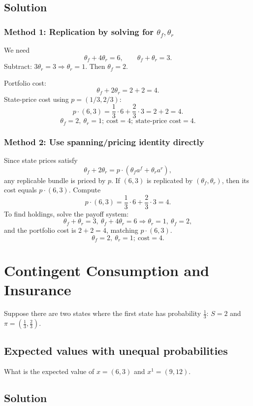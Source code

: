 \documentclass[12pt]{article}
\newcommand{\dotp}{\cdot}
\begin{document}
\subsection*{Solution}
\subsubsection*{Method 1: Replication by solving for \(\theta_f,\theta_r\)}
We need
\[
\theta_f+4\theta_r=6,\qquad \theta_f+\theta_r=3.
\]
Subtract: \(3\theta_r=3\Rightarrow \theta_r=1\). Then \(\theta_f=2\).

Portfolio cost:
\[
\theta_f+2\theta_r=2+2=4.
\]
State-price cost using \(p=(1/3,2/3)\):
\[
p\dotp(6,3)=\frac13\cdot 6+\frac23\cdot 3=2+2=4.
\]
\[
\boxed{\;\theta_f=2,\ \theta_r=1;\ \text{cost}=4;\ \text{state-price cost}=4.\;}
\]

\subsubsection*{Method 2: Use spanning/pricing identity directly}
Since state prices satisfy
\[
\theta_f+2\theta_r=p\dotp(\theta_f a^f+\theta_r a^r),
\]
any replicable bundle is priced by \(p\). If \((6,3)\) is replicated by \((\theta_f,\theta_r)\), then its cost equals \(p\dotp(6,3)\).
Compute
\[
p\dotp(6,3)=\frac13\cdot 6+\frac23\cdot 3=4.
\]
To find holdings, solve the payoff system:
\[
\theta_f+\theta_r=3,\ \theta_f+4\theta_r=6\Rightarrow \theta_r=1,\ \theta_f=2,
\]
and the portfolio cost is \(2+2=4\), matching \(p\dotp(6,3)\).
\[
\boxed{\;\theta_f=2,\ \theta_r=1;\ \text{cost}=4.\;}
\]

\newpage
\section{Contingent Consumption and Insurance}

Suppose there are two states where the first state has probability \(\frac13\): \(S=2\) and \(\pi=\left(\frac13,\frac23\right)\).

\subsection{Expected values with unequal probabilities}
What is the expected value of \(x=(6,3)\) and \(x^{1}=(9,12)\).

\subsection*{Solution}
\end{document}
